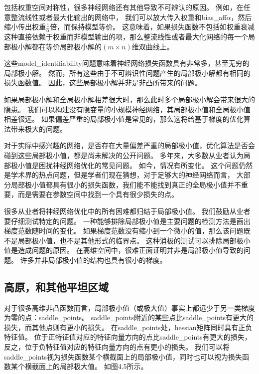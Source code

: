 包括权重空间对称性，很多神经网络还有其他导致不可辨认的原因。
例如，在任意整流线性或者最大化输出的网络中，
我们可以放大传入权重和\gls{bias_aff}$\alpha$，然后缩小传出权重$\frac{1}{\alpha}$倍，而保持模型等价。
这意味着，如果损失函数不包括如权重衰减这种直接依赖于权重而非模型输出的项，那么整流线性或者最大化网络的每一个局部极小解都在等价局部极小解的$(m\times n)$维双曲线上。

这些\gls{model_identifiability}问题意味着神经网络损失函数具有非常多，甚至无穷的局部极小解。
然而，所有这些由于不可辨识性问题产生的局部极小解都有相同的损失函数值。
因此，这些局部极小解并非是非凸所带来的问题。

如果局部极小解和全局极小解相差很大时，那么此时多个局部极小解会带来很大的隐患。
我们可以构建没有隐变量的小规模神经网络，其局部极小值和全局极小值相差很远\citep{Sontag-cs89,Brady89,Gori-pami91}。
如果偏差严重的局部极小值是常见的，那么这将给基于梯度的优化算法带来极大的问题。


对于实际中感兴趣的网络，是否存在大量偏差严重的局部极小值，优化算法是否会碰到这些局部极小值，都是尚未解决的公开问题。
多年来，大多数从业者认为局部极小值是困扰神经网络优化的常见问题。
如今，情况有所变化。
这个问题仍然是学术界的热点问题，但是学者们现在猜想，对于足够大的神经网络而言，
大部分局部极小值都具有很小的损失函数，我们能不能找到真正的全局极小值并不重要，而是需要在参数空间中找到一个具有很少损失的点\citep{Saxe-et-al-ICLR13,Dauphin-et-al-NIPS2014-small,GoodfellowOptimization15,Choromanska-et-al-AISTATS2015}。

很多从业者将神经网络优化中的所有困难都归结于局部极小值。
我们鼓励从业者要仔细测试特定的问题。
一种能够排除局部极小值是主要问题的检测方法是画出梯度范数随时间的变化。
如果梯度范数没有缩小到一个微小的值，那么该问题既不是局部极小值，也不是其他形式的临界点。
这种消极的测试可以排除局部极小值是造成问题的原因。
在高维空间中，很难正面证明并非是局部极小值导致的问题。
许多并非局部极小值的结构也具有很小的梯度。

\subsection{高原，和其他平坦区域}
\label{sec:plateaus_saddle_points_and_other_flat_regions}
对于很多高维非凸函数而言，局部极小值（或极大值）事实上都远少于另一类梯度为零的点：\gls{saddle_points}。
\gls{saddle_points}附近的某些点比\gls{saddle_points}有更大的损失，而其他点则有更小的损失。
在\gls{saddle_points}处，\gls{hessian}矩阵同时具有正负特征值。
位于正特征值对应的特征向量方向的点比\gls{saddle_points}有更大的损失，反之，位于负特征值对应的特征向量方向的点有更小的损失。
我们可以将\gls{saddle_points}视为损失函数某个横截面上的局部极小值，同时也可以视为损失函数某个横截面上的局部极大值。
如图4.5所示。

